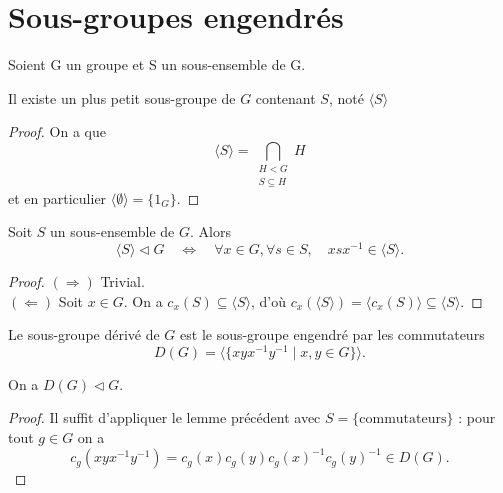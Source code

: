 \section{Sous-groupes engendrés}
Soient G un groupe et S un sous-ensemble de G.

\begin{lemme}
Il existe un plus petit sous-groupe de $G$ contenant $S$, noté $\langle S\rangle$
\end{lemme}

\begin{proof}
    On a que  
\[
\langle S \rangle = \bigcap_{\substack{H < G \\ S \subseteq H}} H
\]
et en particulier \(\langle \emptyset \rangle = \{ 1_G \}\).

\end{proof}

 \begin{lemme}
        Soit \( S \) un sous-ensemble de \( G \). Alors
    \[
    \langle S \rangle \triangleleft G \quad \Leftrightarrow \quad \forall x \in G, \forall s \in S, \quad xsx^{-1} \in \langle S \rangle.
    \]
\end{lemme}

\begin{proof}
    \(( \Rightarrow)\) Trivial.\\
     \((\Leftarrow)\) Soit \( x \in G \). On a \( c_x(S) \subseteq \langle S \rangle \), d’où \( c_x(\langle S \rangle) = \langle c_x(S) \rangle \subseteq \langle S \rangle \).
\end{proof}

\begin{definition}
        Le sous-groupe dérivé de \( G \) est le sous-groupe engendré par les commutateurs
\[
D(G) = \langle \{ xyx^{-1}y^{-1} \mid x,y \in G \} \rangle.
\]

\end{definition}

\begin{lemme}
        On a \( D(G) \triangleleft G \).
\end{lemme}

\begin{proof}
    Il suffit d’appliquer le lemme précédent avec \( S = \{\text{commutateurs}\} \) :
pour tout \( g \in G \) on a 
\[
c_g(xyx^{-1}y^{-1}) = c_g(x)c_g(y)c_g(x)^{-1}c_g(y)^{-1} \in D(G).
\]
\end{proof}

